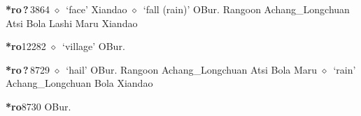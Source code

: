   \begin{list}{}{\leftmargin=1.5em \itemindent=-1.5em}
  \item {\footnotesize \textbf{*ro\,?\,}}{\tiny 3864}
         $\diamond$~`face'
         Xiandao 
\hspace{1ex}
         $\diamond$~`fall (rain)'
         OBur. 
\hspace{1ex}
         Rangoon 
\hspace{1ex}
         Achang\_Longchuan 
\hspace{1ex}
         Atsi 
\hspace{1ex}
         Bola 
\hspace{1ex}
         Lashi 
\hspace{1ex}
         Maru 
\hspace{1ex}
         Xiandao 
  \item {\footnotesize \textbf{*ro}}{\tiny 12282}
\hspace{1ex}
         $\diamond$~`village'
         OBur. 
  \item {\footnotesize \textbf{*ro\,?\,}}{\tiny 8729}
\hspace{1ex}
         $\diamond$~`hail'
         OBur. 
\hspace{1ex}
         Rangoon 
\hspace{1ex}
         Achang\_Longchuan 
\hspace{1ex}
         Atsi 
\hspace{1ex}
         Bola 
\hspace{1ex}
         Maru 
\hspace{1ex}
         $\diamond$~`rain'
         Achang\_Longchuan 
\hspace{1ex}
         Bola 
\hspace{1ex}
         Xiandao 
  \item {\footnotesize \textbf{*ro}}{\tiny 8730}
\hspace{1ex}
         OBur. 
  \end{list}
